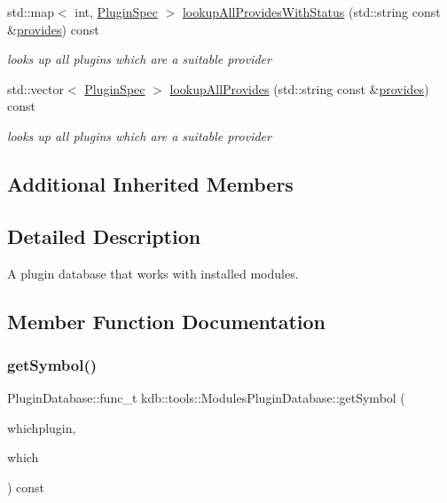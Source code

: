 \begin{DoxyCompactItemize}
std\+::map$<$ int, \hyperlink{classkdb_1_1tools_1_1PluginSpec}{Plugin\+Spec} $>$ \hyperlink{classkdb_1_1tools_1_1ModulesPluginDatabase_abe19487ff2a2e0548288dfa2a5678ae1}{lookup\+All\+Provides\+With\+Status} (std\+::string const \&\hyperlink{classkdb_1_1tools_1_1PluginDatabase_afc91ff760616ee83c6afb70e5a2f0601a73ff10d6a07213c277db4326b3df6c4b}{provides}) const
\begin{DoxyCompactList}\small\item\em looks up all plugins which are a suitable provider \end{DoxyCompactList}\item 
std\+::vector$<$ \hyperlink{classkdb_1_1tools_1_1PluginSpec}{Plugin\+Spec} $>$ \hyperlink{classkdb_1_1tools_1_1ModulesPluginDatabase_a306384e88f9cf2874f6ba9ce28973a26}{lookup\+All\+Provides} (std\+::string const \&\hyperlink{classkdb_1_1tools_1_1PluginDatabase_afc91ff760616ee83c6afb70e5a2f0601a73ff10d6a07213c277db4326b3df6c4b}{provides}) const
\begin{DoxyCompactList}\small\item\em looks up all plugins which are a suitable provider \end{DoxyCompactList}\end{DoxyCompactItemize}
\subsection*{Additional Inherited Members}


\subsection{Detailed Description}
A plugin database that works with installed modules. 

\subsection{Member Function Documentation}
\mbox{\label{classkdb_1_1tools_1_1ModulesPluginDatabase_a0e81e1b7b296a52f8040fd966b461c3a}} 
\subsubsection{\texorpdfstring{get\+Symbol()}{getSymbol()}}
{\footnotesize\ttfamily Plugin\+Database\+::func\+\_\+t kdb\+::tools\+::\+Modules\+Plugin\+Database\+::get\+Symbol (\begin{DoxyParamCaption}\item[{\hyperlink{classkdb_1_1tools_1_1PluginSpec}{Plugin\+Spec} const \&}]{whichplugin,  }\item[{std\+::string const \&}]{which }\end{DoxyParamCaption}) const\hspace{0.3cm}{\ttfamily [virtual]}}



